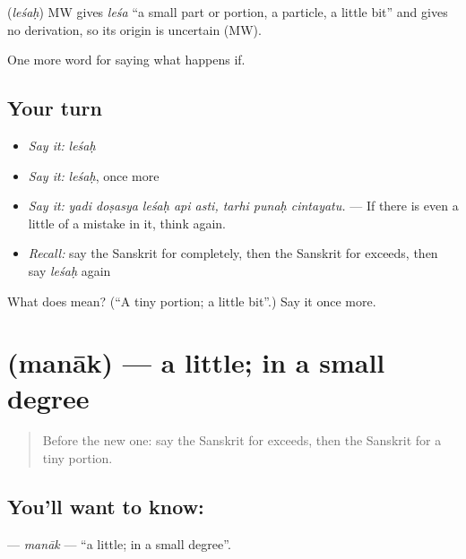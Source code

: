 \begin{cousinweb}
\textbf{} (\emph{leśaḥ}) MW gives \emph{leśa} \textquotedblleft{}a small part or portion, a particle, a little bit\textquotedblright{} and gives no derivation, so its origin is uncertain (MW).
\end{cousinweb}

\begin{grammarlens}[title={What you've built}]
One more word for saying what happens if.
\end{grammarlens}

\subsection*{Your turn}
\begin{itemize}
\raggedright
  \item \emph{Say it:} \emph{leśaḥ}
  \item \emph{Say it:} \emph{leśaḥ}, once more
  \item \emph{Say it:} \emph{yadi doṣasya leśaḥ api asti, tarhi punaḥ cintayatu.} — If there is even a little of a mistake in it, think again.
  \item \emph{Recall:} say the Sanskrit for completely, then the Sanskrit for exceeds, then say \emph{leśaḥ} again
\end{itemize}

\begin{tcolorbox}[breakable,colback=teal!4,colframe=teal!35!black,title={Before you move on}]
What does  mean? (\textquotedblleft{}A tiny portion; a little bit\textquotedblright{}.) Say it once more.
\end{tcolorbox}
\section[\texorpdfstring{\sk{मनाक्} (manāk)}{मनाक् (manāk)}]{ (manāk) — a little; in a small degree}

\label{lesson:SA-C378-manak}



\begin{quote}
Before the new one: say the Sanskrit for exceeds, then the Sanskrit for a tiny portion.
\end{quote}

\subsection*{You'll want to know: }
\textbf{} — \emph{manāk} — \textquotedblleft{}a little; in a small degree\textquotedblright{}.

